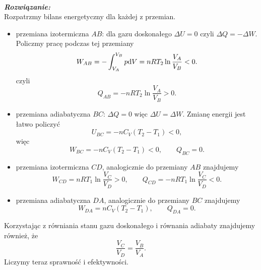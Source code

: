 \documentclass[11pt,a4paper]{article}
\newcounter{rozwiazanie}\newcommand{\rozwiazanie}[1][]{\addtocounter{rozwiazanie}{1} ~\\  {\bf \emph{Rozwiązanie: }} \\}
\begin{document}
\rozwiazanie
Rozpatrzmy bilans energetyczny dla każdej z przemian.
\begin{itemize}
	\item przemiana izotermiczna $AB$: dla gazu doskonałego $\Delta U = 0$ czyli $\Delta Q = - \Delta W$. Policzmy pracę podczas tej przemiany
	\begin{equation}
		W_{AB} = - \int_{V_A}^{V_B} p {\rm d}V =  n R T_2  \ln \frac{V_A}{V_B} < 0.
	\end{equation}
	czyli
	\begin{equation}
		Q_{AB} = - n R T_2 \ln \frac{V_A}{V_B} > 0.
	\end{equation}
	\item przemiana adiabatyczna $BC$: $\Delta Q = 0$ więc $\Delta U = \Delta W$. Zmianę energii jest łatwo policzyć
	\begin{equation}
		U_{BC} = - n C_V (T_2 - T_1) < 0,
	\end{equation}
	więc 
	\begin{equation}
		W_{BC} = - n C_V (T_2 - T_1) < 0, \qquad Q_{BC} = 0.
	\end{equation}
	\item przemiana izotermiczna $CD$, analogicznie do przemiany $AB$ znajdujemy
	\begin{equation}
		W_{CD} =  n R T_1 \ln \frac{V_C}{V_D} > 0, \qquad Q_{CD} = - n RT_1 \ln \frac{V_C}{V_D} < 0.
	\end{equation}
	\item przemiana adiabatyczna $DA$, analogicznie do przemiany $BC$ znajdujemy
	\begin{equation}
		W_{DA} = n C_V (T_2 - T_1), \qquad Q_{DA} = 0.
	\end{equation}
\end{itemize}
Korzystając z równiania stanu gazu doskonałego i równania adiabaty znajdujemy również, że
\begin{equation}
	\frac{V_C}{V_D} = \frac{V_B}{V_A}.
\end{equation}
Liczymy teraz sprawność i efektywności.
\end{document}
